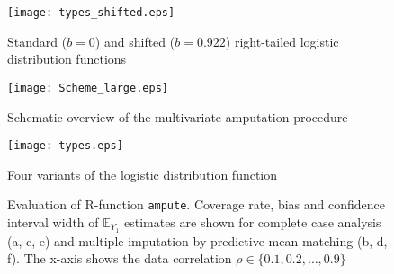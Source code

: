 \documentclass[]{interact}
\newcommand{\code}[1]{\texttt{#1}}
\begin{document}
\begin{figure}
\centering
\texttt{[image: types\_shifted.eps]}
\caption{Standard ($b = 0$) and shifted ($b = 0.922$) right-tailed logistic distribution functions}
\label{types_shifted}
\end{figure}

\setcounter{figure}{1}
\begin{sidewaysfigure}
\hspace*{-1cm}
\texttt{[image: Scheme\_large.eps]}
\caption{Schematic overview of the multivariate amputation procedure}
\label{scheme}
\end{sidewaysfigure}

\begin{figure}
\centering
\texttt{[image: types.eps]}
\caption{Four variants of the logistic distribution function \citep[based on][p. 64]{Stef2012}}
\label{types}
\end{figure}

\begin{figure}
\hspace{5pt}
\hspace{5pt}
\hspace{5pt}
\hspace{5pt}
\hspace{5pt}
\hspace{5pt}
\caption{Evaluation of R-function \code{ampute}. Coverage rate, bias and confidence interval width of $\mathbb{E}_{Y_1}$ estimates are shown for complete case analysis (a, c, e) and multiple imputation by predictive mean matching (b, d, f). The x-axis shows the data correlation $\rho \in \{0.1, 0.2, \dots, 0.9\}$}
\label{sim1}
\end{figure}
\end{document}

